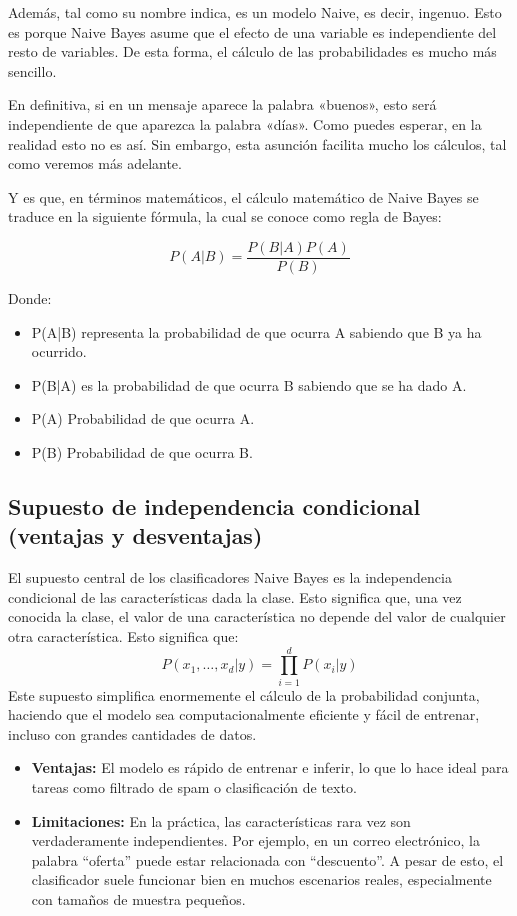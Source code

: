 Además, tal como su nombre indica, es un modelo Naive, es decir, ingenuo. Esto es porque Naive Bayes asume que el efecto de una variable es independiente del resto de variables. De esta forma, el cálculo de las probabilidades es mucho más sencillo.

En definitiva, si en un mensaje aparece la palabra «buenos», esto será independiente de que aparezca la palabra «días». Como puedes esperar, en la realidad esto no es así. Sin embargo, esta asunción facilita mucho los cálculos, tal como veremos más adelante.

Y es que, en términos matemáticos, el cálculo matemático de Naive Bayes se traduce en la siguiente fórmula, la cual se conoce como regla de Bayes:

\begin{equation}
P(A|B) = \frac{P(B|A)P(A)}{P(B)}
\end{equation}

Donde:
\begin{itemize}
\item P(A|B) representa la probabilidad de que ocurra A sabiendo que B ya ha ocurrido.
\item P(B|A) es la probabilidad de que ocurra B sabiendo que se ha dado A.
\item P(A) Probabilidad de que ocurra A.
\item P(B) Probabilidad de que ocurra B.
\end{itemize}

\subsection{Supuesto de independencia condicional (ventajas y desventajas)}

El supuesto central de los clasificadores Naive Bayes es la independencia condicional de las características dada la clase.  Esto significa que, una vez conocida la clase, el valor de una característica no depende del valor de cualquier otra característica.
Esto significa que:
\begin{equation}
P(x_1, \dots, x_d | y) = \prod_{i=1}^d P(x_i | y)
\end{equation}
Este supuesto simplifica enormemente el cálculo de la probabilidad conjunta, haciendo que el modelo sea computacionalmente eficiente y fácil de entrenar, incluso con grandes cantidades de datos.

\begin{itemize}
\item \textbf{Ventajas:} El modelo es rápido de entrenar e inferir, lo que lo hace ideal para tareas como filtrado de spam o clasificación de texto.
\item \textbf{Limitaciones:} En la práctica, las características rara vez son verdaderamente independientes. Por ejemplo, en un correo electrónico, la palabra “oferta” puede estar relacionada con “descuento”. A pesar de esto, el clasificador suele funcionar bien en muchos escenarios reales, especialmente con tamaños de muestra pequeños.
\end{itemize}

